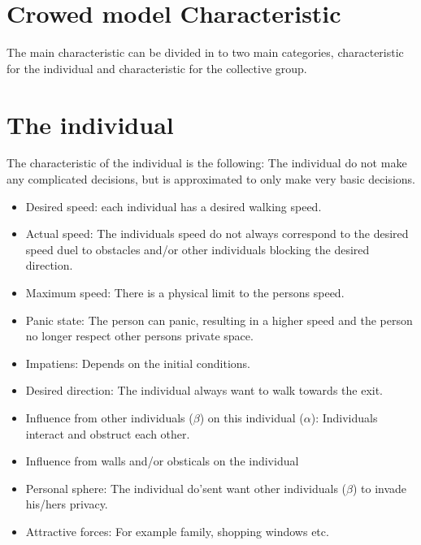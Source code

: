 \documentclass[10pt,a4paper]{article}
\begin{document}
\section{Crowed model Characteristic}
The main characteristic can be divided in to two main categories, characteristic for the individual and characteristic for the collective group.
\section{The individual}
The characteristic of the individual is the following: The individual do not make any complicated decisions, but is approximated to only make very basic decisions.
\begin{itemize}
\item Desired speed: each individual has a desired walking speed.\\
\item Actual speed: The individuals speed do not always correspond to the desired speed duel to obstacles and/or other individuals blocking the desired direction.\\
\item Maximum speed: There is a physical limit to the persons speed.\\
\item Panic state: The person can panic, resulting in a higher speed and the person no longer respect other persons private space.\\
\item Impatiens: Depends on the initial conditions.\\
\item Desired direction: The individual always want to walk towards the exit.\\
\item Influence from other individuals ($\beta$) on this individual ($\alpha$): Individuals interact and obstruct each other.\\
\item Influence from walls and/or obsticals on the individual\\
\item Personal sphere: The individual do'sent want other individuals ($\beta$) to invade his/hers privacy.\\
\item Attractive forces: For example family, shopping windows etc.\\

\end{itemize}
\end{document}
